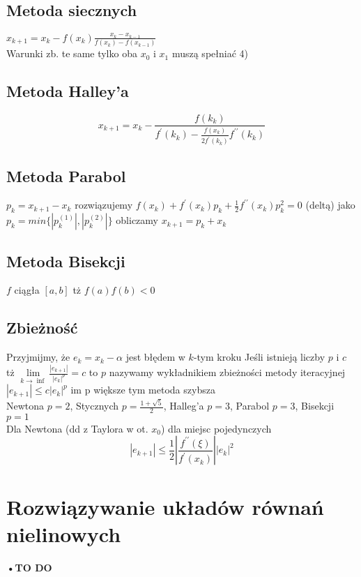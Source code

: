 \documentclass[twocolumn]{article}
\begin{document}
\begin{flushleft}
\subsection{Metoda siecznych}
$x_{k+1} = x_k - f(x_k)\frac{x_k-x_{k-1}}{f(x_k)-f(x_{k-1})}$\\
Warunki zb. te same tylko oba $x_0$ i $x_1$ muszą spełniać 4)\\
\subsection{Metoda Halley'a}
$$x_{k+1}=x_k-\frac{f(k_{k})}{f^{\prime}(k_k)-\frac{f(x_k)}{2f^\prime(k_{k})}f^{\prime \prime}(k_{k})}$$
\subsection{Metoda Parabol}
$p_k=x_{k+1}-x_k$ rozwiązujemy $f(x_k) + f^{\prime}(x_k)p_k+\frac{1}{2}f^{\prime \prime}(x_k)p_k^2=0$ (deltą) jako $p_k=min\{|p_k^{(1)}|,|p_k^{(2)}|\}$ obliczamy $x_{k+1}=p_k+x_k$
\subsection{Metoda Bisekcji}
$f$ ciągła $[a,b]$ tż $f(a)f(b) < 0$ 
\begin{algorithmic}
	\ELSE
	\ENDIF
\ENDFOR
\end{algorithmic}
\subsection{Zbieżność}
Przyjmijmy, że $e_k=x_k - \alpha$ jest błędem w $k$-tym kroku Jeśli istnieją liczby $p$ i $c$ tż $\underset{k \to \inf}{\lim}\frac{|e_{k+1}|}{|e_k|^p}=c$ to $p$ nazywamy wykładnikiem zbieżności metody iteracyjnej\\
$|e_{k+1}| \leq c|e_k|^p$ im p większe tym metoda szybsza\\
Newtona $p=2$, Stycznych $p=\frac{1+\sqrt{5}}{2}$, Halleg'a $p=3$, Parabol $p=3$, Bisekcji $p=1$\\
Dla Newtona (dd z Taylora w ot. $x_0$) dla miejsc pojedynczych
$$|e_{k+1}|\leq \frac{1}{2}\left| \frac{f^{\prime \prime}(\xi)}{f^{\prime}(x_k)}\right| |e_k|^2$$
\section{Rozwiązywanie układów równań nielinowych}
{\Large \textbf{•TO DO}}


\end{flushleft}
\end{document}

